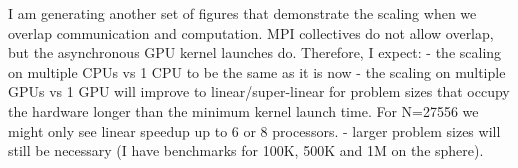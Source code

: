 I am generating another set of figures that demonstrate the scaling when we overlap communication and computation. MPI collectives do not allow overlap, but the asynchronous GPU kernel launches do. Therefore, I expect:
    - the scaling on multiple CPUs vs 1 CPU to be the same as it is now
    - the scaling on multiple GPUs vs 1 GPU will improve to linear/super-linear for problem sizes that occupy the hardware longer than the minimum kernel launch time. For N=27556 we might only see linear speedup up to 6 or 8 processors. 
    - larger problem sizes will still be necessary (I have benchmarks for 100K, 500K and 1M on the sphere).
    

%
%

